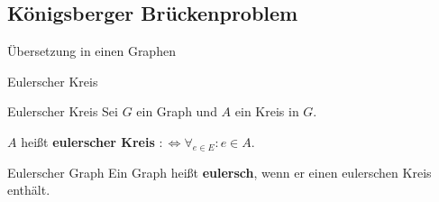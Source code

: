 \subsection{Königsberger Brückenproblem}




\begin{frame}{Übersetzung in einen Graphen}
\begin{center}
\end{center}
\end{frame}

\begin{frame}{Eulerscher Kreis}
\begin{block}{Eulerscher Kreis}
Sei $G$ ein Graph und $A$ ein Kreis in $G$.

$A$ heißt \textbf{eulerscher Kreis} $:\Leftrightarrow \forall_{e \in E}: e \in A$.
\end{block}

\begin{block}{Eulerscher Graph}
Ein Graph heißt \textbf{eulersch}, wenn er einen eulerschen Kreis enthält.
\end{block}
\end{frame}

